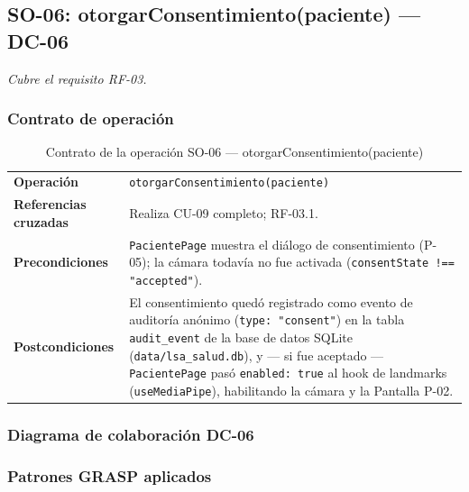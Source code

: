 \subsection{SO-06: otorgarConsentimiento(paciente) --- DC-06}
\textit{Cubre el requisito RF-03.}

\subsubsection{Contrato de operación}

\begin{table}[H]
\centering
\begin{tabularx}{\textwidth}{@{}p{4.4cm} X@{}}
\toprule
\textbf{Operación} & \texttt{otorgarConsentimiento(paciente)} \\
\textbf{Referencias cruzadas} & Realiza CU-09 completo; RF-03.1. \\
\textbf{Precondiciones} & \texttt{PacientePage} muestra el diálogo de
consentimiento (P-05); la cámara todavía no fue activada
(\texttt{consentState !== "accepted"}). \\
\textbf{Postcondiciones} & El consentimiento quedó registrado como evento
de auditoría anónimo (\texttt{type: "consent"}) en la tabla
\texttt{audit\_event} de la base de datos SQLite
(\texttt{data/lsa\_salud.db}), y --- si fue aceptado --- \texttt{PacientePage}
pasó \texttt{enabled: true} al hook de landmarks (\texttt{useMediaPipe}),
habilitando la cámara y la Pantalla P-02. \\
\bottomrule
\end{tabularx}
\caption{Contrato de la operación SO-06 --- otorgarConsentimiento(paciente)}
\label{tab:col-contrato-so06}
\end{table}

\subsubsection{Diagrama de colaboración DC-06}


\subsubsection{Patrones GRASP aplicados}

